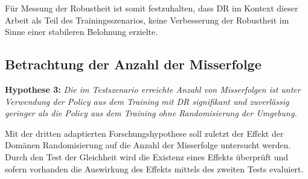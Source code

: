 Für Messung der Robustheit ist somit festzuhalten, dass DR im Kontext dieser Arbeit als Teil des Trainingsszenarios, keine Verbesserung der Robustheit im Sinne einer stabileren Belohnung erzielte.

\subsection{Betrachtung der Anzahl der Misserfolge}

\textbf{Hypothese 3:}
\textit{Die im Testszenario erreichte Anzahl von Misserfolgen ist unter Verwendung der Policy aus dem Training mit DR signifikant und zuverlässig geringer als die Policy aus dem Training ohne Randomisierung der Umgebung.}

Mit der dritten adaptierten Forschungshypothese soll zuletzt der Effekt der Domänen Randomisierung auf die Anzahl der Misserfolge untersucht werden.
Durch den Test der Gleichheit wird die Existenz eines Effekts überprüft und sofern vorhanden die Auswirkung des Effekts mittels des zweiten Tests evaluiert.


